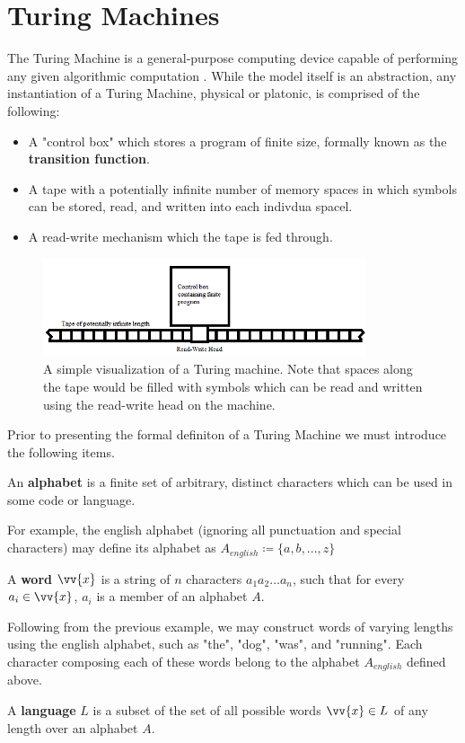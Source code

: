 \documentclass{article}
\begin{document}
\section{Turing Machines}
The Turing Machine is a general-purpose computing device capable of performing any given algorithmic computation \cite{1}.  While the model itself is an abstraction, any instantiation of a Turing Machine, physical or platonic, is comprised of the following:
\begin{itemize}
	\item A "control box" which stores a program of finite size, formally known as the \textbf{transition function}.
	\item A tape with a potentially infinite number of memory spaces in which symbols can be stored, read, and written into each indivdua spacel.
	\item A read-write mechanism which the tape is fed through. \cite{3}
\end{itemize}
\begin{figure}[h]
	\includegraphics[width=0.85\textwidth]{figure-3-1}
	\centering
	\setlength{\belowcaptionskip}{-10pt}
	\caption{A simple visualization of a Turing machine.  Note that spaces along the tape would be filled with symbols which can be read and written using the read-write head on the machine.}
\end{figure}

\noindent Prior to presenting the formal definiton of a Turing Machine we must introduce the following items.

\begin{defin}
	An \textbf{alphabet} is a finite set of arbitrary, distinct characters which can be used in some code or language.
\end{defin}
\noindent For example, the english alphabet (ignoring all punctuation and special characters) may define its alphabet as $A_{english} \coloneq \{ a, b, ... , z \}$
\begin{defin}
	A \textbf{word} $\vv{x}$ is a string of $n$ characters $a_{1}a_{2} \dots a_{n}$, such that for every $a_{i} \in \vv{x}$, $a_{i}$ is a member of an alphabet $A$.
\end{defin}
\noindent Following from the previous example, we may construct words of varying lengths using the english alphabet, such as "the", "dog", "was", and "running".  Each character composing each of these words belong to the alphabet $A_{english}$ defined above. \cite{4}
\begin{defin}
	A \textbf{language} $L$ is a subset of the set of all possible words $\vv{x} \in L$ of any length over an alphabet $A$.
\end{defin}
\end{document}
